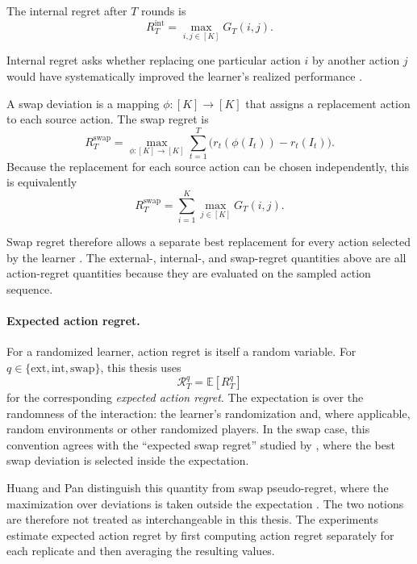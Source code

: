 \begin{definition}
The internal regret after \(T\) rounds is
\[
    R_T^{\mathrm{int}}
    =
    \max_{i,j\in[K]}G_T(i,j).
\]
\end{definition}

Internal regret asks whether replacing one particular action \(i\) by another
action \(j\) would have systematically improved the learner's realized
performance \citep{hart_simple_2000}.

\begin{definition}
A swap deviation is a mapping \(\phi:[K]\rightarrow[K]\) that assigns a
replacement action to each source action. The swap regret is
\[
    R_T^{\mathrm{swap}}
    =
    \max_{\phi:[K]\rightarrow[K]}
    \sum_{t=1}^{T}
    \bigl(
        r_t(\phi(I_t))-r_t(I_t)
    \bigr).
\]
Because the replacement for each source action can be chosen independently,
this is equivalently
\[
    R_T^{\mathrm{swap}}
    =
    \sum_{i=1}^{K}
    \max_{j\in[K]}G_T(i,j).
\]
\end{definition}

Swap regret therefore allows a separate best replacement for every action
selected by the learner \citep{goos_general_2003,blum_external_2007}. The
external-, internal-, and swap-regret quantities above are all action-regret
quantities because they are evaluated on the sampled action sequence.

\paragraph{Expected action regret.}
For a randomized learner, action regret is itself a random variable. For
\(q\in\{\mathrm{ext},\mathrm{int},\mathrm{swap}\}\), this thesis uses
\[
    \mathcal{R}_T^{q}
    =
    \mathbb{E}\!\left[R_T^{q}\right]
\]
for the corresponding \emph{expected action regret}. The expectation is over
the randomness of the interaction: the learner's randomization and, where
applicable, random environments or other randomized players. In the swap
case, this convention agrees with the ``expected swap regret'' studied by
\citet{huang_near-optimal_2023}, where the best swap deviation is selected
inside the expectation.

Huang and Pan distinguish this quantity from swap pseudo-regret, where the
maximization over deviations is taken outside the expectation
\citep{huang_near-optimal_2023}. The two notions are therefore not treated as
interchangeable in this thesis. The experiments estimate expected action regret
by first computing action regret separately for each replicate and then
averaging the resulting values.


